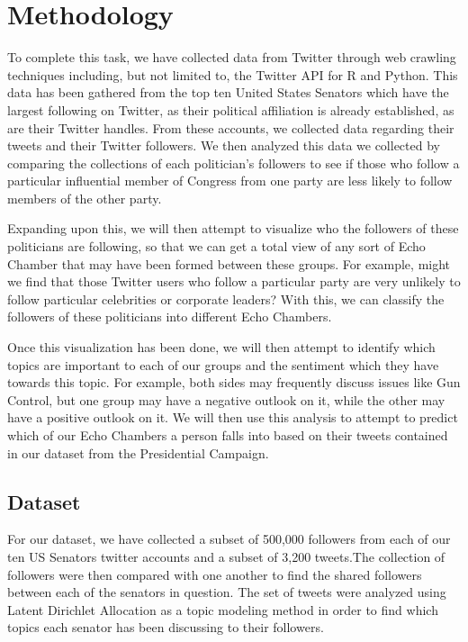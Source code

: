 \documentclass[journal]{IEEEtran}
\begin{document}
	\section{Methodology}
	
	To complete this task, we have collected data from Twitter through web crawling techniques including, but not limited to, the Twitter API for R and Python. This data has been gathered from the top ten United States Senators which have the largest following on Twitter, as their political affiliation is already established, as are their Twitter handles. From these accounts, we collected data regarding their tweets and their Twitter followers. We then analyzed this data we collected by comparing the collections of each politician's followers to see if those who follow a particular influential member of Congress from one party are less likely to follow members of the other party. 
	
	Expanding upon this, we will then attempt to visualize who the followers of these politicians are following, so that we can get a total view of any sort of Echo Chamber that may have been formed between these groups. For example, might we find that those Twitter users who follow a particular party are very unlikely to follow particular celebrities or corporate leaders? With this, we can classify the followers of these politicians into different Echo Chambers. 
	
	Once this visualization has been done, we will then attempt to identify which topics are important to each of our groups and the sentiment which they have towards this topic. For example, both sides may frequently discuss issues like Gun Control, but one group may have a negative outlook on it, while the other may have a positive outlook on it. We will then use this analysis to attempt to predict which of our Echo Chambers a person falls into based on their tweets contained in our dataset from the Presidential Campaign.
	
	\subsection{Dataset}
	
	For our dataset, we have collected a subset of 500,000 followers from each of our ten US Senators twitter accounts and a subset of 3,200 tweets.The collection of followers were then compared with one another to find the shared followers between each of the senators in question. The set of tweets were analyzed using Latent Dirichlet Allocation as a topic modeling method in order to find which topics each senator has been discussing to their followers. 
	
\end{document}
